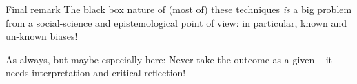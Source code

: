 \begin{frame}{Final remark}
  The black box nature of (most of) these techniques \emph{is} a big problem from a social-science and epistemological point of view: in particular, known and un-known biases!

As always, but maybe especially here: Never take the outcome as a given -- it needs interpretation and critical reflection!

\end{frame}
